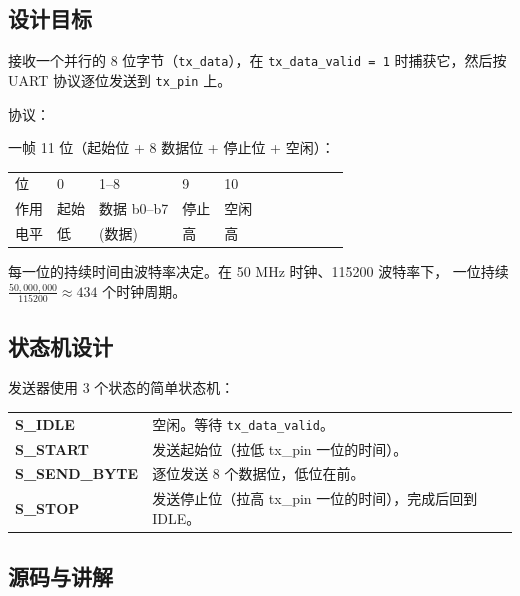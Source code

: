 \subsection{设计目标}

接收一个并行的 8 位字节（\texttt{tx\_data}），在 \texttt{tx\_data\_valid = 1}
时捕获它，然后按 UART 协议逐位发送到 \texttt{tx\_pin} 上。

协议：

一帧 11 位（起始位 + 8 数据位 + 停止位 + 空闲）：

\begin{center}
\begin{tabular}{lllllllllll}
位 & 0 & 1--8 & 9 & 10 \\
作用 & 起始 & 数据 b0--b7 & 停止 & 空闲 \\
电平 & 低 & (数据) & 高 & 高 \\
\end{tabular}
\end{center}

每一位的持续时间由波特率决定。在 50 MHz 时钟、115200 波特率下，
一位持续 \( \frac{50,000,000}{115200} \approx 434 \) 个时钟周期。

\subsection{状态机设计}

发送器使用 3 个状态的简单状态机：

\begin{center}
\begin{tabular}{l l}
\textbf{S\_IDLE} & 空闲。等待 \texttt{tx\_data\_valid}。 \\
\textbf{S\_START} & 发送起始位（拉低 tx\_pin 一位的时间）。 \\
\textbf{S\_SEND\_BYTE} & 逐位发送 8 个数据位，低位在前。 \\
\textbf{S\_STOP} & 发送停止位（拉高 tx\_pin 一位的时间），完成后回到 IDLE。 \\
\end{tabular}
\end{center}

\subsection{源码与讲解}

